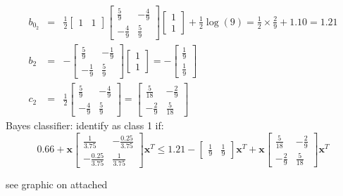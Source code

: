 \documentclass{article}
\begin{document}
\begin{itemize}
\begin{eqnarray*}
b_{0_2} & = & \frac{1}{2} \begin{bmatrix}
1 & 1
\end{bmatrix} \begin{bmatrix}
\frac{5}{9} & -\frac{4}{9} \\
-\frac{4}{9} & \frac{5}{9}
\end{bmatrix} 
\begin{bmatrix}
1 \\
1
\end{bmatrix}+ \frac{1}{2} \log(9) = \frac{1}{2} \times \frac{2}{9} + 1.10 = 1.21 \\
b_2 & = & -\begin{bmatrix}
\frac{5}{9} & -\frac{1}{9} \\
-\frac{1}{9} & \frac{5}{9}
\end{bmatrix} \begin{bmatrix}
1 \\ 1
\end{bmatrix} = - \begin{bmatrix}
\frac{1}{9} \\ \frac{1}{9}
\end{bmatrix} \\
c_2 & = & \frac{1}{2} \begin{bmatrix}
\frac{5}{9} & -\frac{4}{9} \\
-\frac{4}{9} & \frac{5}{9}
\end{bmatrix} = \begin{bmatrix}
\frac{5}{18} & -\frac{2}{9} \\
-\frac{2}{9} & \frac{5}{18}
\end{bmatrix}
\end{eqnarray*}
Bayes classifier: identify as class 1 if:
\begin{equation*}
0.66 + \mathbf{x} \begin{bmatrix}
\frac{1}{3.75} & -\frac{0.25}{3.75} \\
-\frac{0.25}{3.75} & \frac{1}{3.75}
\end{bmatrix}\mathbf{x}^T \le 1.21  -\begin{bmatrix}
\frac{1}{9} & \frac{1}{9}
\end{bmatrix} \mathbf{x}^T + \mathbf{x}  \begin{bmatrix}
\frac{5}{18} & -\frac{2}{9} \\
-\frac{2}{9} & \frac{5}{18}
\end{bmatrix} \mathbf{x}^T
\end{equation*}

see graphic on attached


\end{itemize}
\end{document}
